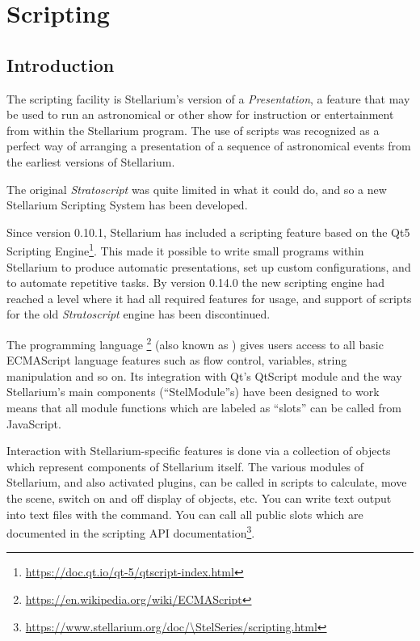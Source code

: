 
\chapter{Scripting}
\label{ch:scripting}


\section{Introduction}
\label{sec:scripting:introduction}

The scripting facility is Stellarium's version of a
\emph{Presentation}, a feature that may be used to run an astronomical
or other show for instruction or entertainment from within the
Stellarium program. The use of scripts was recognized as a perfect way 
of arranging a presentation of a sequence of astronomical events 
from the earliest versions of Stellarium. 

The original \emph{Stratoscript} was quite limited in what it could do, 
and so a new Stellarium Scripting System has been developed.

Since version 0.10.1, Stellarium has included a scripting feature based on
the Qt5 Scripting
Engine\footnote{\url{https://doc.qt.io/qt-5/qtscript-index.html}}. This
made it possible to write small programs within Stellarium to produce
automatic presentations, set up custom configurations, and to automate
repetitive tasks. 
By version 0.14.0 the new scripting engine had reached a level where
it had all required features for usage, and support of scripts for
the old \emph{Stratoscript} engine has been discontinued.

The programming language
\footnote{\url{https://en.wikipedia.org/wiki/ECMAScript}}
(also known as ) gives users access to all basic ECMAScript
language features such as flow control, variables, string manipulation
and so on. Its integration with Qt's QtScript module and the way Stellarium's main 
components (``StelModule''s) have been designed to work means that all module 
functions which are labeled as ``slots'' can be called from JavaScript.

Interaction with Stellarium-specific features is done via a collection
of objects which represent components of Stellarium itself.  The
various modules of Stellarium, and also activated plugins, can be
called in scripts to calculate, move the scene, switch on and off
display of objects, etc.  You can write text output into text files
with the  command.  You can call all public slots
which are documented in the scripting API documentation\footnote{
\url{https://www.stellarium.org/doc/\StelSeries/scripting.html}}.


